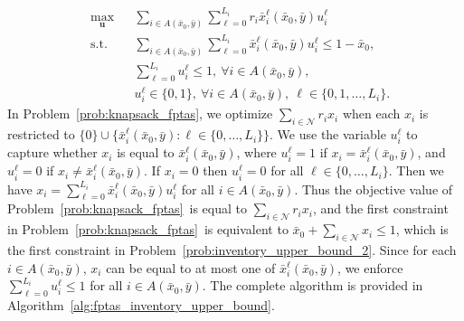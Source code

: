 \documentclass[mnsc,non-blindrev]{informs3}
\theoremstyle{definition}
\begin{document}
\begin{appendices}{\Large{}}
\begin{equation}\label{prob:knapsack_fptas}
\begin{aligned}
&\max_{\bm{u}}&&\sum_{i\in A(\bar{x}_0,\bar{y})}\sum_{\ell=0}^{L_i}r_i\bar{x}_i^{\ell}(\bar{x}_0,\bar{y})u_i^\ell\\
&\text{s.t.}&&\sum_{i\in A(\bar{x}_0,\bar{y})}\sum_{\ell=0}^{L_i}\bar{x}_i^{\ell}(\bar{x}_0,\bar{y})u_i^\ell\leq 1-\bar{x}_0,\\
&&&\sum_{\ell=0}^{L_i} u_i^\ell\leq 1,\ \forall i\in A(\bar{x}_0,\bar{y}),\\
&&&u_i^\ell\in\{0,1\},\ \forall i\in A(\bar{x}_0,\bar{y}),\ \ell\in\{0,1,\dots,L_i\}.
\end{aligned}
\end{equation}
In Problem~\eqref{prob:knapsack_fptas}, we optimize $\sum_{i\in\mathcal{N}}r_ix_i$ when each $x_i$ is restricted to $\{0\}\cup\{\bar{x}_i^\ell(\bar{x}_0,\bar{y}):\ell\in\{0,\dots,L_i\}\}$. We use the variable $u_i^\ell$ to capture whether $x_i$ is equal to $\bar{x}_i^\ell(\bar{x}_0,\bar{y})$, where $u_i^\ell=1$ if $x_i=\bar{x}_i^\ell(\bar{x}_0,\bar{y})$, and $u_i^\ell=0$ if $x_i\neq \bar{x}_i^\ell(\bar{x}_0,\bar{y})$. If $x_i=0$ then $u_i^\ell=0$ for all $\ell\in\{0,\dots,L_i\}$. Then we have $x_i=\sum_{\ell=0}^{L_i}\bar{x}_i^{\ell}(\bar{x}_0,\bar{y})u_i^\ell$ for all $i\in A(\bar{x}_0,\bar{y})$. Thus the objective value of Problem~\eqref{prob:knapsack_fptas}~is equal to $\sum_{i\in\mathcal{N}}r_ix_i$, and the first constraint in Problem~\eqref{prob:knapsack_fptas}~is equivalent to $\bar{x}_0+\sum_{i\in\mathcal{N}}x_i\leq 1$, which is the first constraint in Problem~\eqref{prob:inventory_upper_bound_2}. Since for each $i\in A(\bar{x}_0,\bar{y})$, $x_i$ can be equal to at most one of $\bar{x}_i^\ell(\bar{x}_0,\bar{y})$, we enforce $\sum_{\ell=0}^{L_i}u_i^\ell\leq 1$ for all $i\in A(\bar{x}_0,\bar{y})$. The complete algorithm is provided in Algorithm~\ref{alg:fptas_inventory_upper_bound}.


\end{appendices}
\end{document}
